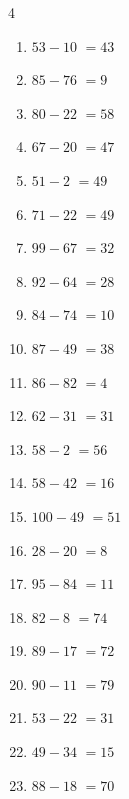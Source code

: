 \begin{multicols}{4}
\begin{enumerate}
  \item $53-10$
        $=43$

  \item $85-76$
        $=9$

  \item $80-22$
        $=58$

  \item $67-20$
        $=47$

  \item $51-2$
        $=49$

  \item $71-22$
        $=49$

  \item $99-67$
        $=32$

  \item $92-64$
        $=28$

  \item $84-74$
        $=10$

\columnbreak %

  \item $87-49$
        $=38$

  \item $86-82$
        $=4$

  \item $62-31$
        $=31$

  \item $58-2$
        $=56$

  \item $58-42$
        $=16$

  \item $100-49$
        $=51$

  \item $28-20$
        $=8$

  \item $95-84$
        $=11$

  \item $82-8$
        $=74$

  \item $89-17$
        $=72$

  \item $90-11$
        $=79$

  \item $53-22$
        $=31$

  \item $49-34$
        $=15$

  \item $88-18$
        $=70$


\end{enumerate}
\end{multicols}
